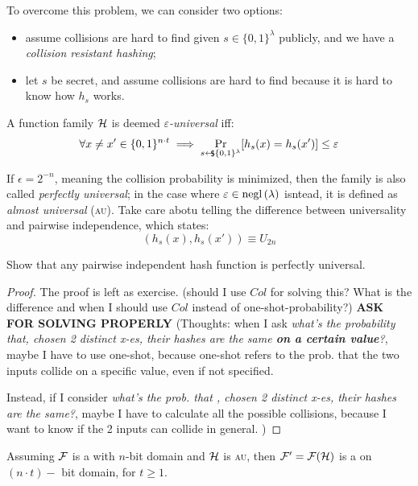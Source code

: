 To overcome this problem, we can consider two options:
\begin{itemize}
    \item assume collisions are hard to find given $s \in \{0,1\}^{\lambda}$ publicly, and we have a \textit{collision resistant hashing};
    \item let $s$ be secret, and assume collisions are hard to find because it is hard to know how $h_{s}$ works.
\end{itemize}

\begin{definition}
    A function family $\mathcal{H}$ is deemed \emph{$\varepsilon$-universal} iff:
    \[
        \forall x \neq x' \in \{0, 1\}^{n\cdot t} \implies \Pr_{s \pickUAR \{0, 1\}^\lambda}[h_s(x) = h_s(x') ] \leq \epsilon  
    \]
\end{definition}

If $\epsilon = 2^{-n}$, meaning the collision probability is minimized, then the family is also called \emph{perfectly universal}; in the case where $\varepsilon \in \mathrm{negl}\left({\lambda}\right)$ isntead, it is defined as \emph{almost universal} (\textsc{au}). Take care abotu telling the difference between universality and pairwise independence, which states:
\[
    (h_s(x), h_s(x')) \equiv U_{2n}
\]

\begin{lemma}
    Show that any pairwise independent hash function is perfectly universal.
\end{lemma}

\begin{proof} The proof is left as exercise.
    (should I use $Col$ for solving this? What is the difference and when I should use $Col$ instead of one-shot-probability?) \textbf{ASK FOR SOLVING PROPERLY} (Thoughts: when I ask \textit{what's the probability that, chosen 2 distinct x-es, their hashes are the same \textbf{on a certain value}?}, maybe I have to use one-shot, because one-shot refers to the prob. that the two inputs collide on a specific value, even if not specified.

    Instead, if I consider \textit{what's the prob. that , chosen 2 distinct x-es, their hashes are the same?}, maybe I have to calculate all the possible collisions, because I want to know if the 2 inputs can collide in general. )
\end{proof}

\begin{theorem}
    Assuming $\mathcal{F}$ is a \prf{} with $n$-bit domain and $\mathcal{H}$ is \textsc{au}, then $\mathcal{F}' = \mathcal{F}(\mathcal{H})$ is a \prf{} on $(n\cdot t)-$ bit domain, for $t \geq 1$.
\end{theorem}

